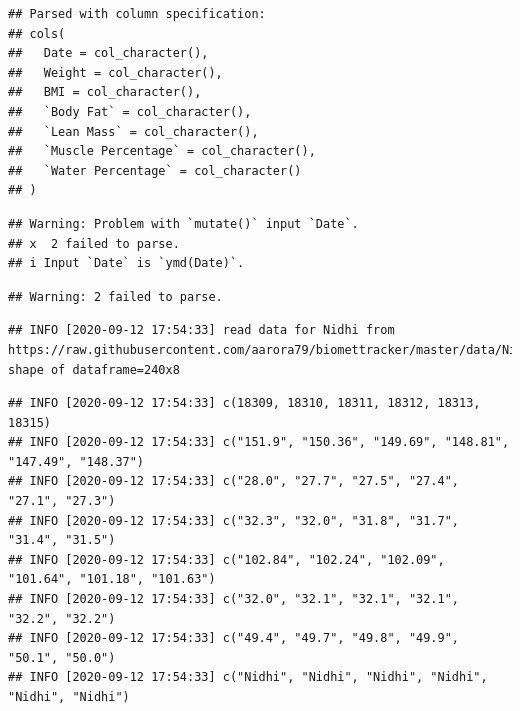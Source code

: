 \documentclass[oneside]{book}
\begin{document}
\begin{verbatim}
## Parsed with column specification:
## cols(
##   Date = col_character(),
##   Weight = col_character(),
##   BMI = col_character(),
##   `Body Fat` = col_character(),
##   `Lean Mass` = col_character(),
##   `Muscle Percentage` = col_character(),
##   `Water Percentage` = col_character()
## )
\end{verbatim}

\begin{verbatim}
## Warning: Problem with `mutate()` input `Date`.
## x  2 failed to parse.
## i Input `Date` is `ymd(Date)`.
\end{verbatim}

\begin{verbatim}
## Warning: 2 failed to parse.
\end{verbatim}

\begin{verbatim}
## INFO [2020-09-12 17:54:33] read data for Nidhi from https://raw.githubusercontent.com/aarora79/biomettracker/master/data/Nidhi.csv, shape of dataframe=240x8
\end{verbatim}

\begin{verbatim}
## INFO [2020-09-12 17:54:33] c(18309, 18310, 18311, 18312, 18313, 18315)
## INFO [2020-09-12 17:54:33] c("151.9", "150.36", "149.69", "148.81", "147.49", "148.37")
## INFO [2020-09-12 17:54:33] c("28.0", "27.7", "27.5", "27.4", "27.1", "27.3")
## INFO [2020-09-12 17:54:33] c("32.3", "32.0", "31.8", "31.7", "31.4", "31.5")
## INFO [2020-09-12 17:54:33] c("102.84", "102.24", "102.09", "101.64", "101.18", "101.63")
## INFO [2020-09-12 17:54:33] c("32.0", "32.1", "32.1", "32.1", "32.2", "32.2")
## INFO [2020-09-12 17:54:33] c("49.4", "49.7", "49.8", "49.9", "50.1", "50.0")
## INFO [2020-09-12 17:54:33] c("Nidhi", "Nidhi", "Nidhi", "Nidhi", "Nidhi", "Nidhi")
\end{verbatim}
\end{document}
